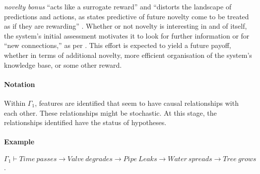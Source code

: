 \begin{description}
  \emph{novelty bonus} ``acts like a surrogate reward'' and ``distorts
  the landscape of predictions and actions, as states predictive of
  future novelty come to be treated as if they are rewarding''
  \cite[p.~554]{kakade2002dopamine}.  Whether or not novelty is
  interesting in and of itself, the system's initial assessment
  motivates it to look for further information or for ``new
  connections,'' as per \citet{Makri2012a}.  This effort is expected
  to yield a future payoff, whether in terms of additional novelty,
  more efficient organisation of the system's knowledge base, or some
  other reward.
\end{description}

\paragraph{\textbf{\upshape Notation}}

Within $\Gamma_1$, features are identified that seem to have causal
relationships with each other.  These relationships might be
stochastic.  At this stage, the relationships identified have the
status of hypotheses.

\paragraph{\textbf{\upshape Example}}
 $\Gamma_1 \vdash \mathit{Time\ passes} \rightarrow
\mathit{Valve\ degrades} \rightarrow \mathit{Pipe\ Leaks} \rightarrow \mathit{Water\ spreads} \rightarrow \mathit{Tree\ grows}$.


